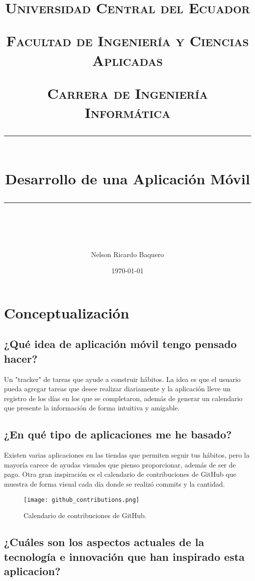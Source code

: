 \documentclass[11pt]{scrartcl} %
\title{	
	\normalfont\normalsize
	\textsc{Universidad Central del Ecuador}

	\textsc{Facultad de Ingeniería y Ciencias Aplicadas}

	\textsc{Carrera de Ingeniería Informática}
	\vspace{6pt} %
	\rule{\linewidth}{0.5pt}\\ %
	\vspace{20pt} %
	{\huge Desarrollo de una Aplicación Móvil}\\ %
	\vspace{12pt} %
	\rule{\linewidth}{2pt}\\ %
	\vspace{12pt} %
}
\author{\LARGE Nelson Ricardo Baquero} %
\date{\normalsize\today} %
\begin{document}
\maketitle %

\section{Conceptualización}

\subsection{¿Qué idea de aplicación móvil tengo pensado hacer?}

Un "tracker" de tareas que ayude a construir hábitos. La idea es que el usuario pueda agregar tareas que desee realizar diariamente y la aplicación lleve un registro de los días en los que se completaron, además de generar un calendario que presente la información de forma intuitiva y amigable.



\subsection{¿En qué tipo de aplicaciones me he basado?}

Existen varias aplicaciones en las tiendas que permiten seguir tus hábitos, pero la mayoría carece de ayudas visuales que pienso proporcionar, además de ser de pago. Otra gran inspiración es el calendario de contribuciones de GitHub que muestra de forma visual cada día donde se realizó commits y la cantidad.

\begin{figure}[h] %
	\centering
	\texttt{[image: github\_contributions.png]} %
	\caption{Calendario de contribuciones de GitHub.}
\end{figure}

\subsection{¿Cuáles son los aspectos actuales de la tecnología e innovación que han inspirado esta aplicacion?}
\end{document}
